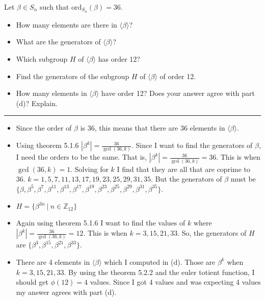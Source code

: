 \documentclass[titlepage]{article}
\newenvironment{problem}[2][Problem]{\begin{trivlist}
\item[\hskip \labelsep {\bfseries #1}\hskip \labelsep {\bfseries #2.}]}{\end{trivlist}}
\begin{document}
\begin{problem}{8}
Let $\beta \in S_n$ such that $\text{ord}_{S_n}(\beta) = 36$.
\begin{itemize}
\item[(a)] How many elements are there in $\langle \beta \rangle$?
\item[(b)] What are the generators of $\langle \beta \rangle$?
\item[(c)] Which subgroup $H$ of $\langle \beta \rangle$ has order 12?
\item[(d)] Find the generators of the subgroup $H$ of $\langle \beta \rangle$ of order 12.
\item[(e)] How many elements in $\langle \beta \rangle$ have order 12? Does your answer agree with part (d)? Explain.
\end{itemize}
\hrule
\begin{itemize}
\item[(a)] Since the order of $\beta$ is 36, this means that there are 36 elements in $\langle \beta \rangle$.
\item[(b)] Using theorem 5.1.6 $|\beta^k| = \frac{36}{\gcd(36,k)}$. Since I want to find the generators of $\beta$, I need the orders to be the same. That is, $|\beta^k| = \frac{36}{\gcd(36,k)} = 36$. This is when $\gcd(36,k) = 1$. Solving for $k$ I find that they are all that are coprime to 36. $k=1,5,7,11,13,17,19,23,25,29,31,35$. But the generators of $\beta$ must be $\{\beta, \beta^5, \beta^7, \beta^{11}, \beta^{13}, \beta^{17}, \beta^{19}, \beta^{23}, \beta^{25}, \beta^{29}, \beta^{31}, \beta^{35}\}$.
\item[(c)] $H = \{ \beta^{3n} \ | \ n \in \mathbb{Z}_{12}\}$
\item[(d)] Again using theorem 5.1.6 I want to find the values of $k$ where $|\beta^k| = \frac{36}{\gcd(36,k)} = 12.$ This is when $k = 3,15,21,33$. So, the generators of $H$ are $\{\beta^3, \beta^{15}, \beta^{21}, \beta^{33} \}$.
\item[(e)] There are 4 elements in $\langle \beta \rangle$ which I computed in (d). Those are $\beta^k$ when $k=3,15,21,33$. By using the theorem 5.2.2 and the euler totient function, I should get $\phi(12) = 4$ values. Since I got 4 values and was expecting 4 values my answer agrees with part (d).
\end{itemize}
\end{problem}
\end{document}
